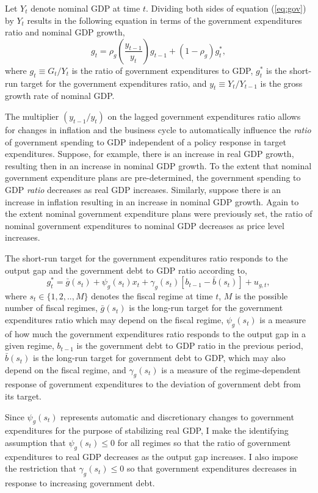 \documentclass[11pt]{article}
\newcommand{\beq}{\begin{equation}}
\newcommand{\eeq}{\end{equation}}
\begin{document}
Let $Y_t$ denote nominal GDP at time $t$.  Dividing both sides of equation (\ref{eq:gov}) by $Y_t$ results in the following equation in terms of the government expenditures ratio and nominal GDP growth,
\beq \label{eq:govrat} g_t = \rho_g \left( \frac{y_{t-1}}{y_t} \right) g_{t-1} + \left(1-\rho_g\right) g_t^*, \eeq
where $g_t \equiv G_t / Y_t$ is the ratio of government expenditures to GDP, $g_t^*$ is the short-run target for the government expenditures ratio, and $y_t \equiv Y_t / Y_{t-1}$ is the gross growth rate of nominal GDP.

The multiplier $(y_{t-1}/y_t)$ on the lagged government expenditures ratio allows for changes in inflation and the business cycle to automatically influence the \textit{ratio} of government spending to GDP independent of a policy response in target expenditures.  Suppose, for example, there is an increase in real GDP growth, resulting then in an increase in nominal GDP growth.  To the extent that nominal government expenditure plans are pre-determined, the government spending to GDP \textit{ratio} decreases as real GDP increases.  Similarly, suppose there is an increase in inflation resulting in an increase in nominal GDP growth.  Again to the extent nominal government expenditure plans were previously set, the ratio of nominal government expenditures to nominal GDP decreases as price level increases.

The short-run target for the government expenditures ratio responds to the output gap and the government debt to GDP ratio according to,
\beq \label{eq:govtarget} g_t^* = \bar{g}(s_t) + \psi_g(s_t) x_t + \gamma_g(s_t) \left[ b_{t-1} - \bar{b}(s_t) \right] + u_{g,t}, \eeq
where $s_t \in \{1,2,..,M\}$ denotes the fiscal regime at time $t$, $M$ is the possible number of fiscal regimes, $\bar{g}(s_t)$ is the long-run target for the government expenditures ratio which may depend on the fiscal regime, $\psi_g(s_t)$ is a measure of how much the government expenditures ratio responds to the output gap in a given regime, $b_{t-1}$ is the government debt to GDP ratio in the previous period, $\bar{b}(s_t)$ is the long-run target for government debt to GDP, which may also depend on the fiscal regime, and $\gamma_g(s_t)$ is a measure of the regime-dependent response of government expenditures to the deviation of government debt from its target.  

Since $\psi_g(s_t)$ represents automatic and discretionary changes to government expenditures for the purpose of stabilizing real GDP, I make the identifying assumption that $\psi_g(s_t) \leq 0$ for all regimes so that the ratio of government expenditures to real GDP decreases as the output gap increases.  I also impose the restriction that $\gamma_g(s_t) \leq 0$ so that government expenditures decreases in response to increasing government debt.
\end{document}
